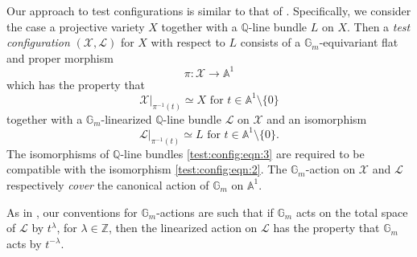 \documentclass[12pt]{amsart}
\renewcommand{\AA}{\mathbb{A}} %
\newcommand{\QQ}{\mathbb{Q}} %
\newcommand{\ZZ}{\mathbb{Z}} %
\newcommand{\GG}{\mathbb{G}}
\theoremstyle{definition}
\numberwithin{equation}{section}
\begin{document}
Our approach to test configurations is similar to that of \cite{Boucksom-Hisamoto-Jonsson:2016}.  Specifically, we consider the case a projective variety $X$ together with a $\QQ$-line bundle $L$ on $X$.  Then a \emph{test configuration} $(\mathcal{X},\mathcal{L})$ for $X$ with respect to $L$ consists of a $\GG_m$-equivariant flat and proper morphism
\begin{equation}\label{test:config:eqn:1}
\pi \colon \mathcal{X} \rightarrow \AA^1
\end{equation}
which has the property that 
\begin{equation}\label{test:config:eqn:2}
\mathcal{X}\big|_{\pi^{-1}(t)} \simeq X \text{ for $t \in \AA^1 \setminus \{0\}$}
\end{equation}
together with a $\GG_m$-linearized $\QQ$-line bundle $\mathcal{L}$ on $\mathcal{X}$ and an isomorphism
\begin{equation}\label{test:config:eqn:3}
\mathcal{L}\big|_{\pi^{-1}(t)} \simeq L  \text{ for $t \in \AA^1 \setminus \{0\}$.}
\end{equation}
The isomorphisms of $\QQ$-line bundles \eqref{test:config:eqn:3} are required to be compatible with the isomorphism \eqref{test:config:eqn:2}.  The $\GG_m$-action on $\mathcal{X}$ and $\mathcal{L}$ respectively \emph{cover} the canonical action of $\GG_m$ on $\AA^1$.

As in \cite{Mum:GIT}, our conventions for $\GG_m$-actions are such that if $\GG_m$ acts on the total space of $\mathcal{L}$ by $t^\lambda$, for $\lambda \in \ZZ$, then the linearized action on $\mathcal{L}$ has the property that $\GG_m$ acts by $t^{-\lambda}$.   
\end{document}

